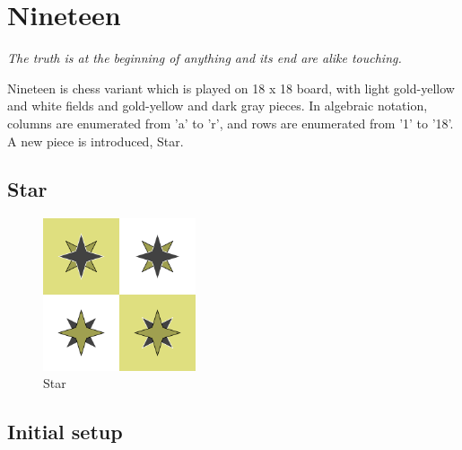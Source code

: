 \documentclass[a5paper,12pt,draft]{book} %
\begin{document}
\clearpage

\chapter*{Nineteen}

\begin{flushright}
\parbox{0.8\textwidth}{
\emph{The truth is at the beginning of anything and its end are alike touching. \\
 } }
\end{flushright}

Nineteen is chess variant which is played on 18 x 18 board, with
light gold-yellow and white fields and gold-yellow and dark gray
pieces. In algebraic notation, columns are enumerated from 'a' to 'r',
and rows are enumerated from '1' to '18'. A new piece is introduced,
Star.

\clearpage

\section*{Star}

\noindent
\begin{figure}
\includegraphics[width=0.4\textwidth, keepaspectratio=true]{../gfx/pieces/11_star.png}
\caption{Star}
\label{fig:star}
\end{figure}

\clearpage

\section*{Initial setup}
\end{document}
